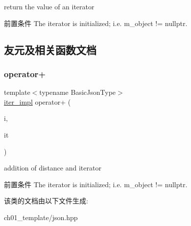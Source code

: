 return the value of an iterator 

\begin{DoxyPrecond}{前置条件}
The iterator is initialized; i.\+e. {\ttfamily m\+\_\+object != nullptr}. 
\end{DoxyPrecond}


\subsection{友元及相关函数文档}
\mbox{\label{classnlohmann_1_1detail_1_1iter__impl_a94108d1a7563e103534f23eb5c1ee175}} 
\subsubsection{\texorpdfstring{operator+}{operator+}}
{\footnotesize\ttfamily template$<$typename Basic\+Json\+Type$>$ \\
\mbox{\hyperlink{classnlohmann_1_1detail_1_1iter__impl}{iter\+\_\+impl}} operator+ (\begin{DoxyParamCaption}\item[{\mbox{\hyperlink{classnlohmann_1_1detail_1_1iter__impl_a2f7ea9f7022850809c60fc3263775840}{difference\+\_\+type}}}]{i,  }\item[{const \mbox{\hyperlink{classnlohmann_1_1detail_1_1iter__impl}{iter\+\_\+impl}}$<$ Basic\+Json\+Type $>$ \&}]{it }\end{DoxyParamCaption})\hspace{0.3cm}{\ttfamily [friend]}}



addition of distance and iterator 

\begin{DoxyPrecond}{前置条件}
The iterator is initialized; i.\+e. {\ttfamily m\+\_\+object != nullptr}. 
\end{DoxyPrecond}


该类的文档由以下文件生成\+:\begin{DoxyCompactItemize}
\item 
ch01\+\_\+template/json.\+hpp\end{DoxyCompactItemize}
